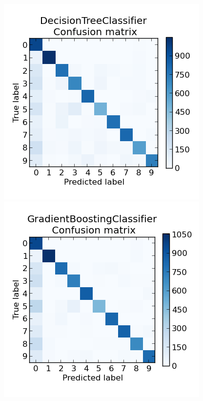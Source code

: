 \documentclass{scrartcl}
\begin{document}
\begin{figure}[H]
\begin{minipage}{.5\textwidth}
\end{minipage}
\begin{minipage}{.5\textwidth}
  \centering
  \includegraphics[width=.8\linewidth]{img/DecisionTreeClassifier.png}
\end{minipage}%
\begin{minipage}{.5\textwidth}
  \centering
  \includegraphics[width=.8\linewidth]{img/GradientBoostingClassifier.png}
\end{minipage}
\begin{minipage}{.5\textwidth}

\end{minipage}
\end{figure}
\end{document}
